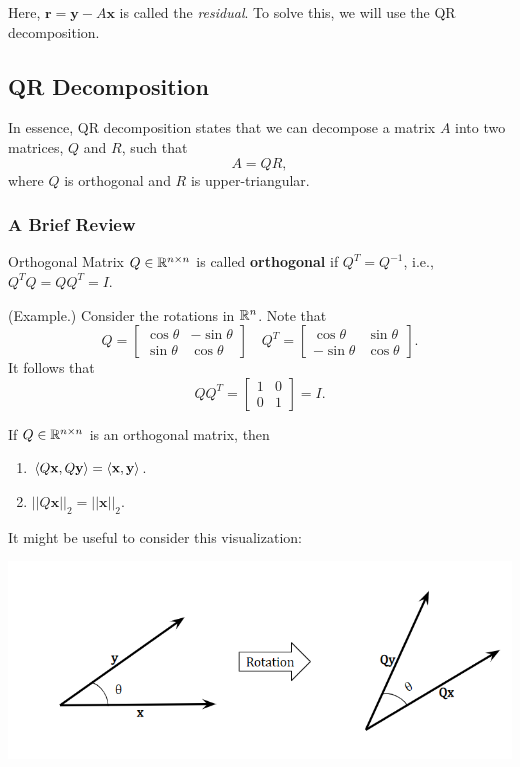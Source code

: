 \documentclass[letterpaper]{article}
\newcommand{\0}{\mathbf{0}}
\newcommand{\y}{\mathbf{y}}
\newcommand{\x}{\mathbf{x}}
\newcommand{\rr}{\mathbf{r}}
\begin{document}
Here, $\rr = \y - A\x$ is called the \emph{residual}. To solve this, we will use the QR decomposition. 

\subsection{QR Decomposition}
In essence, QR decomposition states that we can decompose a matrix $A$ into two matrices, $Q$ and $R$, such that 
\[A = QR,\]
where $Q$ is orthogonal and $R$ is upper-triangular. 

\subsubsection{A Brief Review}
\begin{definition}{Orthogonal Matrix}{}
    $Q \in \mathbb{R}^{n \times n}$ is called \textbf{orthogonal} if $Q^T = Q^{-1}$, i.e., $Q^T Q = QQ^T = I$. 
\end{definition}

\begin{mdframed}
    (Example.) Consider the rotations in $\mathbb{R}^n$. Note that 
    \[Q = \begin{bmatrix}
        \cos\theta & -\sin\theta \\ 
        \sin\theta & \cos\theta
    \end{bmatrix} \quad Q^T = \begin{bmatrix}
        \cos\theta & \sin\theta \\ 
        -\sin\theta & \cos\theta 
    \end{bmatrix}.\]
    It follows that \[QQ^T = \begin{bmatrix}
        1 & 0 \\ 0 & 1
    \end{bmatrix} = I.\]
\end{mdframed}

\begin{theorem}{}{}
    If $Q \in \mathbb{R}^{n \times n}$ is an orthogonal matrix, then 
    \begin{enumerate}
        \item $\cyclic{Q\x, Q\y} = \cyclic{\x, \y}$. 
        \item $||Q\x||_2 = ||\x||_2$.
    \end{enumerate}    
\end{theorem}
It might be useful to consider this visualization: 
\begin{center}
    \includegraphics[scale=0.8]{assets/angle_orth.png}
\end{center}
\end{document}
